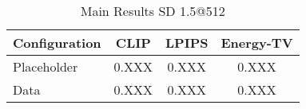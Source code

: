 
\begin{table}[H]
\centering
\caption{Main Results SD 1.5@512}
\label{tab:table3_main_results}
\begin{tabular}{lccc}
\toprule
Configuration & CLIP & LPIPS & Energy-TV \\
\midrule
Placeholder & 0.XXX & 0.XXX & 0.XXX \\
Data & 0.XXX & 0.XXX & 0.XXX \\
\bottomrule
\end{tabular}
\end{table}
